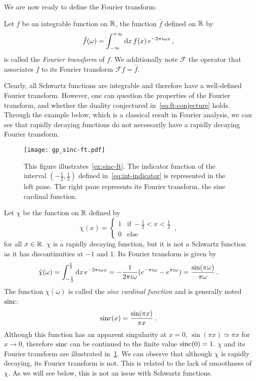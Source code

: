 We are now ready to define the Fourier transform:
\begin{definition}
  Let $f$ be an integrable function on $\mathbb{R}$, the function $\hat{f}$ defined on $\mathbb{R}$ by
  \begin{equation}
    \hat{f}(\omega)=\int_{-\infty}^{+\infty}\mathrm{d} x\,f(x)\,e^{-2\pi i\omega x}\,,
  \end{equation}
  is called the \emph{Fourier transform} of $f$. We additionally note $\mathcal{F}$ the
  operator that associates $f$ to its Fourier transform $\mathcal{F}f=\hat{f}$.
\end{definition}
Clearly, all Schwartz functions are integrable and therefore have a well-defined Fourier
transform. However, one can question the properties of the Fourier transform, and whether
the duality conjectured in~\cref{eq:ft-conjecture} holds. Through the example below, which
is a classical result in Fourier analysis, we can see that rapidly decaying functions do
not necessarily have a rapidly decaying Fourier transform.
\begin{figure}[t]
  \centering
  \texttt{[image: gp\_sinc-ft.pdf]}
  \caption{This figure illustrates~\cref{ex:sinc-ft}. The indicator function of the
    interval $(-\frac{1}{2},\frac{1}{2})$ defined in~\cref{eq:int-indicator} is represented
    in the left pane. The right pane represents its Fourier transform, the sine cardinal
  function.}
  \label{fig:sinc-ft}
\end{figure}
\begin{example}
  \label{ex:sinc-ft}
  Let $\chi$ be the function on $\mathbb{R}$ defined by
  \begin{equation}
    \chi(x)=
    \begin{cases}
      1&\text{if}~-\frac{1}{2}<x<\frac{1}{2}\\
      0&\text{else}
    \end{cases}\,,
    \label{eq:int-indicator}
  \end{equation}
  for all $x\in\mathbb{R}$. $\chi$ is a rapidly decaying function, but it is not a Schwartz
  function as it has discontinuities at $-1$ and $1$. Its Fourier transform is given by
  \begin{equation}
    \hat{\chi}(\omega)=\int_{-\frac12}^{\frac12}\mathrm{d} x\,e^{-2\pi i\omega x}=
    -\frac{1}{2\pi i\omega}(e^{-\pi i\omega}-e^{\pi i\omega})=\frac{\sin(\pi\omega)}{\pi\omega}\,.
  \end{equation}
  The function $\hat{\chi}(\omega)$ is called the \emph{sine cardinal function} and is
  generally noted $\operatorname{sinc}$:
  \begin{equation}
    \operatorname{sinc}(x)=\frac{\sin(\pi x)}{\pi x}\,.
  \end{equation}
  Although this function has an apparent singularity at $x=0$, $\sin(\pi x)\simeq \pi x$
  for $x\to0$, therefore $\operatorname{sinc}$ can be continued to the finite value $\operatorname{sinc}(0)=1$. $\chi$
  and its Fourier transform are illustrated in~\cref{fig:sinc-ft}. We can observe that
  although $\chi$ is rapidly decaying, its Fourier transform is not. This is related to
  the lack of smoothness of $\chi$. As we will see below, this is not an issue with
  Schwartz functions.
\end{example}
